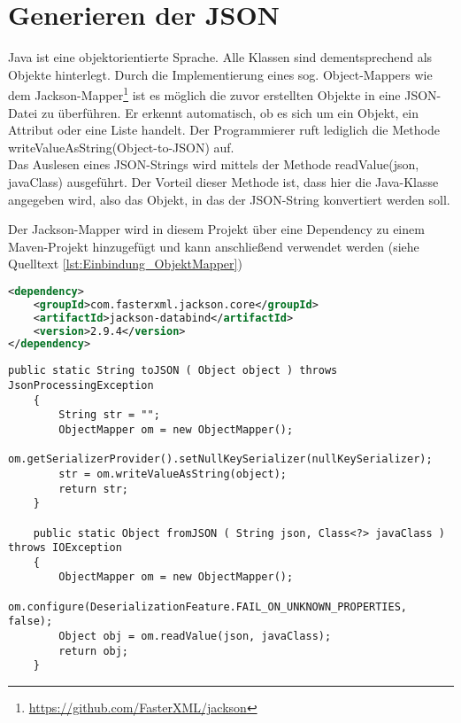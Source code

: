 \section{Generieren der \acf{JSON}}
\label{sec:json_generieren}
Java ist eine objektorientierte Sprache.
Alle Klassen sind dementsprechend als Objekte hinterlegt.
Durch die Implementierung eines sog. Object-Mappers wie dem Jackson-Mapper\footnote{\url{https://github.com/FasterXML/jackson}}
ist es möglich die zuvor erstellten Objekte in eine \acs{JSON}-Datei zu überführen.
Er erkennt automatisch, ob es sich um ein Objekt, ein Attribut oder eine Liste handelt.
Der Programmierer ruft lediglich die Methode writeValueAsString(Object-to-JSON) auf. \\
Das Auslesen eines \acs{JSON}-Strings wird mittels der Methode readValue(json, javaClass) ausgeführt.
Der Vorteil dieser Methode ist, dass hier die Java-Klasse angegeben wird, also das Objekt, in das der \acs{JSON}-String konvertiert werden soll.

Der Jackson-Mapper wird in diesem Projekt über eine Dependency zu einem Maven-Projekt hinzugefügt und kann anschließend verwendet werden (siehe Quelltext \ref{lst:Einbindung_ObjektMapper}) %

\begin{minipage}{\linewidth}
\begin{lstlisting}[language=XML]
<dependency>
	<groupId>com.fasterxml.jackson.core</groupId>
	<artifactId>jackson-databind</artifactId>
	<version>2.9.4</version>
</dependency>
\end{lstlisting}
\label{lst:Einbindung_ObjektMapper}
\end{minipage}

\begin{minipage}{\linewidth}
	\begin{lstlisting}[style=lstJava]
	public static String toJSON ( Object object ) throws JsonProcessingException
	{
		String str = "";
		ObjectMapper om = new ObjectMapper();
		om.getSerializerProvider().setNullKeySerializer(nullKeySerializer);
		str = om.writeValueAsString(object);
		return str;
	}
	
	public static Object fromJSON ( String json, Class<?> javaClass ) throws IOException
	{
		ObjectMapper om = new ObjectMapper();
		om.configure(DeserializationFeature.FAIL_ON_UNKNOWN_PROPERTIES, false);
		Object obj = om.readValue(json, javaClass);
		return obj;
	}
	\end{lstlisting}
\end{minipage}
